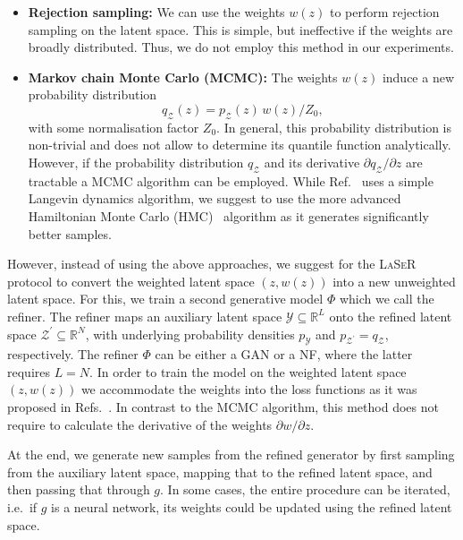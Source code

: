 \begin{itemize}
    \item \textbf{Rejection sampling:}
    We can use the weights $w(z)$ to perform rejection sampling on the latent space. This is simple, but ineffective if the weights are broadly distributed. Thus, we do not employ this method in our experiments.
    \item \textbf{Markov chain Monte Carlo (MCMC):}
    The weights $w(z)$ induce a new probability distribution
    \begin{equation}
        q_\mathcal{Z}(z)= p_\mathcal{Z}(z)\,w(z)/Z_0,
        \label{eq:mcmc_distribution}
    \end{equation}
    with some normalisation factor $Z_0$. In general, this probability distribution is non-trivial and does not allow to determine its quantile function analytically.
However, if the probability distribution $q_\mathcal{Z}$ and its derivative $\partial q_\mathcal{Z}/\partial z$ are tractable a MCMC algorithm can be employed. While Ref.~\cite{che2020gan} uses a simple Langevin dynamics algorithm, we suggest to use the more advanced Hamiltonian Monte Carlo (HMC)~\cite{DUANE1987216,neal2012mcmc} algorithm as it generates significantly better samples.
\end{itemize}

However, instead of using the above approaches, we suggest for the \textsc{LaSeR} protocol to convert the weighted latent space $(z,w(z))$ into a new unweighted latent space.
For this, we train a second generative model $\Phi$ which we call the refiner. The refiner maps an auxiliary latent space $\mathcal{Y}\subseteq\mathbb{R}^L$ onto the refined latent space $\mathcal{Z}^\prime\subseteq\mathbb{R}^N$, with underlying probability densities $p_\mathcal{Y}$ and
$p_{\mathcal{Z}^\prime}=q_\mathcal{Z}$, respectively.
The refiner $\Phi$ can be either a GAN or a NF, where the latter requires $L=N$. In order to train the model on the weighted latent space $(z,w(z))$ we accommodate the weights into the loss functions as it was proposed in Refs.~\cite{Backes:2020vka, Verheyen:2020bjw}. In contrast to the MCMC algorithm, this method does not require to calculate the derivative of the weights $\partial w/\partial z$.

At the end, we generate new samples from the refined generator by first sampling from the auxiliary latent space, mapping that to the refined latent space, and then passing that through $g$. In some cases, the entire procedure can be iterated, i.e.\ if $g$ is a neural network, its weights could be updated using the refined latent space.


